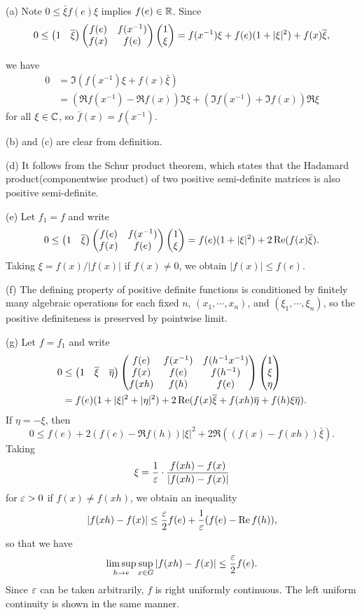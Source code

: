 \documentclass{../../small}
\begin{document}
\begin{pf}
(a)
Note $0\le\bar\xi f(e)\xi$ implies $f(e)\in\mathbb{R}$.
Since
\[0\le\begin{pmatrix}1&\overline\xi\end{pmatrix}\begin{pmatrix}f(e)&f(x^{-1})\\f(x)&f(e)\end{pmatrix}\begin{pmatrix}1\\\xi\end{pmatrix}=f(x^{-1})\xi+f(e)(1+|\xi|^2)+f(x)\overline\xi,\]

we have
\begin{align*}
0&=\Im(f(x^{-1})\xi+f(x)\bar\xi)\\
&=(\Re f(x^{-1})-\Re f(x))\Im\xi+(\Im f(x^{-1})+\Im f(x))\Re\xi
\end{align*}
for all $\xi\in\mathbb{C}$, so $\bar f(x)=f(x^{-1})$.

(b) and (c) are clear from definition.

(d) It follows from the Schur product theorem, which states that the Hadamard product(componentwise product) of two positive semi-definite matrices is also positive semi-definite.

(e)
Let $f_1=f$ and write
\[0\le\begin{pmatrix}1&\overline\xi\end{pmatrix}\begin{pmatrix}f(e)&f(x^{-1})\\f(x)&f(e)\end{pmatrix}\begin{pmatrix}1\\\xi\end{pmatrix}=f(e)(1+|\xi|^2)+2\operatorname{Re}(f(x)\overline\xi).\]
Taking $\xi=f(x)/|f(x)|$ if $f(x)\ne0$, we obtain $|f(x)|\le f(e)$.

(f)
The defining property of positive definite functions is conditioned by finitely many algebraic operations for each fixed $n$, $(x_1,\cdots,x_n)$, and $(\xi_1,\cdots,\xi_n)$, so the positive definiteness is preserved by pointwise limit.

(g)
Let $f=f_1$ and write
\begin{align*}
0&\le\begin{pmatrix}1&\overline\xi&\overline\eta\end{pmatrix}\begin{pmatrix}f(e)&f(x^{-1})&f(h^{-1}x^{-1})\\f(x)&f(e)&f(h^{-1})\\f(xh)&f(h)&f(e)\end{pmatrix}\begin{pmatrix}1\\\xi\\\eta\end{pmatrix}\\
&=f(e)(1+|\xi|^2+|\eta|^2)+2\operatorname{Re}(f(x)\overline\xi+f(xh)\overline\eta+f(h)\xi\overline\eta).
\end{align*}
If $\eta=-\xi$, then
\[0\le f(e)+2(f(e)-\Re f(h))|\xi|^2+2\Re((f(x)-f(xh))\bar\xi).\]
Taking
\[\xi=\frac1{\varepsilon}\cdot\frac{f(xh)-f(x)}{|f(xh)-f(x)|}\]
for $\varepsilon>0$ if $f(x)\ne f(xh)$, we obtain an inequality
\[|f(xh)-f(x)|\le\frac{\varepsilon}2f(e)+\frac1{\varepsilon}(f(e)-\operatorname{Re} f(h)),\]
so that we have
\[\limsup_{h\to e}\sup_{x\in G}|f(xh)-f(x)|\le\frac{\varepsilon}2f(e).\]
Since $\varepsilon$ can be taken arbitrarily, $f$ is right uniformly continuous.
The left uniform continuity is shown in the same manner.
\end{pf}
\end{document}
